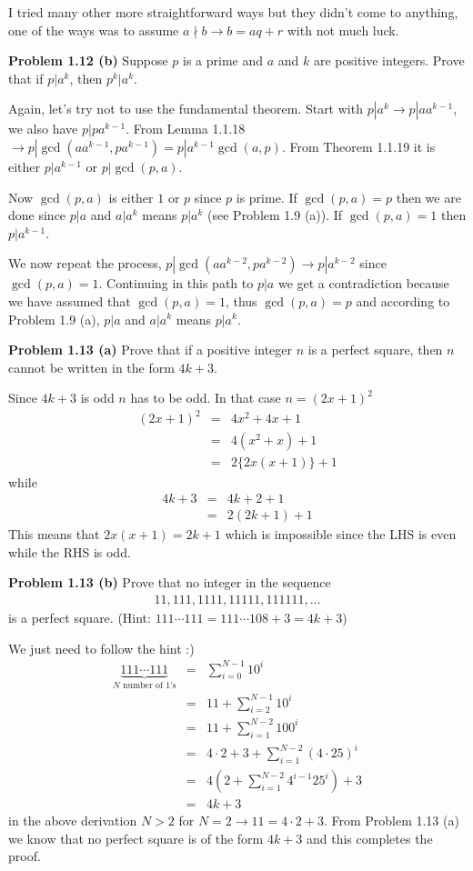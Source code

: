 \documentclass[aps,preprint,preprintnumbers,nofootinbib,showpacs,prd]{revtex4-1}
\newcommand{\nbea}{\begin{eqnarray*}}
\newcommand{\neea}{\end{eqnarray*}}
\begin{document}
I tried many other more straightforward ways but they didn't come to anything, one of the ways was to assume $a \nmid b \to b = aq + r$ with not much luck.

{\bf Problem 1.12 (b)} Suppose $p$ is a prime and $a$ and $k$ are positive integers. Prove that if $p|a^k$, then $p^k|a^k$.

Again, let's try not to use the fundamental theorem. Start with $p|a^k \to p | a a^{k-1}$, we also have $p | p a^{k-1}$. From Lemma 1.1.18 $\to p|\gcd(a a^{k-1}, p a^{k-1}) = p|a^{k-1}\gcd(a,p)$. From Theorem 1.1.19 it is either $p|a^{k-1}$ or $p|\gcd(p,a)$.

Now $\gcd(p,a)$ is either $1$ or $p$ since $p$ is prime. If $\gcd(p,a) = p$ then we are done since $p|a$ and $a|a^k$ means $p|a^k$ (see Problem 1.9 (a)). If $\gcd(p,a) = 1$ then $p|a^{k-1}$.

We now repeat the process, $p|\gcd(a a^{k-2}, p a^{k-2}) \to p|a^{k-2}$ since $\gcd(p,a) = 1$. Continuing in this path to $p|a$ we get a contradiction because we have assumed that $\gcd(p,a) = 1$, thus  $\gcd(p,a) = p$ and according to Problem 1.9 (a), $p|a$ and $a|a^k$ means $p|a^k$.

{\bf Problem 1.13 (a)} Prove that if a positive integer $n$ is a perfect square, then $n$ cannot be written in the form $4k + 3$.

Since $4k+3$ is odd $n$ has to be odd. In that case $n = (2x+1)^2$
%
\nbea
(2x+1)^2 & = & 4x^2 + 4x + 1 \\
& = & 4(x^2 + x) + 1 \\
& = & 2 \{2x(x + 1)\} + 1
\neea
%
while
%
\nbea
4k + 3 & = & 4k + 2 + 1 \\
& = & 2(2k+1) + 1
\neea
%
This means that $2 x (x + 1) = 2k + 1$ which is impossible since the LHS is even while the RHS is odd.

{\bf Problem 1.13 (b)} Prove that no integer in the sequence
%
\nbea
11, 111, 1111, 11111, 111111, \dots
\neea
%
is a perfect square. (Hint: $111 \cdots 111 = 111 \cdots 108 + 3 = 4k+3$)

We just need to follow the hint :)
%
\nbea
\underbrace{111 \cdots 111}_\text{$N$ number of 1's} & = & \sum_{i=0}^{N-1} 10^i \\
& = & 11 + \sum_{i=2}^{N-1} 10^i \\
& = & 11 + \sum_{i=1}^{N-2} 100^i \\
& = & 4 \cdot 2 + 3 + \sum_{i=1}^{N-2} (4 \cdot 25)^i \\
& = & 4 \left(2 + \sum_{i=1}^{N-2} 4^{i-1} 25^i \right ) + 3 \\
& = & 4k + 3
\neea
%
in the above derivation $N > 2$ for $N=2 \to 11 = 4 \cdot 2 + 3$. From Problem 1.13 (a) we know that no perfect square is of the form $4k + 3$ and this completes the proof.
\end{document}
